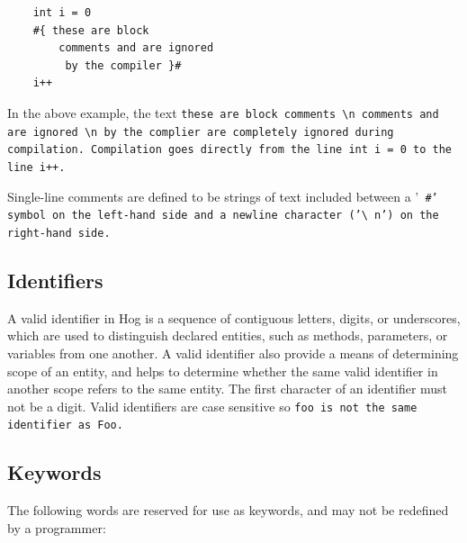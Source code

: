 \documentclass{article}
\begin{document}
\begin{verbatim}
    int i = 0
    #{ these are block
        comments and are ignored
         by the compiler }#
    i++
\end{verbatim}

In the above example, the text \tt these are block comments \textbackslash n comments and are ignored \textbackslash n by the
complier \rm are completely ignored during compilation. Compilation goes directly from the line \tt int i = 0 \rm to the line
\tt i++\rm.

Single-line comments are defined to be strings of text included between a '\tt
\#\rm' symbol on the left-hand side and a newline character ('\tt\textbackslash
n\rm') on the right-hand side.


\subsection{Identifiers} %
\label{sub:identifiers}

A valid identifier in Hog is a sequence of contiguous letters, digits, or
underscores, which are used to distinguish declared entities, such as 
methods, parameters, or variables from one another. A valid identifier also
provide a means of determining scope of an entity, and helps to determine whether
the same valid identifier in another scope refers to the same entity. The first
character of an identifier must not be a digit. Valid identifiers are case sensitive
so \tt foo \rm is not the same identifier as \tt Foo\rm.


\subsection{Keywords} %
\label{sub:keywords}

The following words are reserved for use as keywords, and may not be redefined by a programmer:
\end{document}
